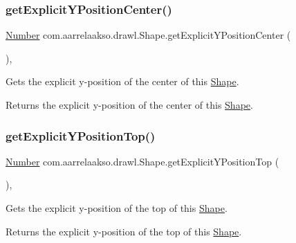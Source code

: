 \subsubsection{\texorpdfstring{get\+Explicit\+Y\+Position\+Center()}{getExplicitYPositionCenter()}}
{\footnotesize\ttfamily \hyperlink{interfacecom_1_1aarrelaakso_1_1drawl_1_1_number}{Number} com.\+aarrelaakso.\+drawl.\+Shape.\+get\+Explicit\+Y\+Position\+Center (\begin{DoxyParamCaption}{ }\end{DoxyParamCaption})\hspace{0.3cm}{\ttfamily [protected]}, {\ttfamily [inherited]}}



Gets the explicit y-\/position of the center of this \hyperlink{classcom_1_1aarrelaakso_1_1drawl_1_1_shape}{Shape}. 

\begin{DoxyReturn}{Returns}
the explicit y-\/position of the center of this \hyperlink{classcom_1_1aarrelaakso_1_1drawl_1_1_shape}{Shape}. 
\end{DoxyReturn}
\mbox{\label{classcom_1_1aarrelaakso_1_1drawl_1_1_shape_a8c65dff2026744ae10648de3908165e5}} 
\subsubsection{\texorpdfstring{get\+Explicit\+Y\+Position\+Top()}{getExplicitYPositionTop()}}
{\footnotesize\ttfamily \hyperlink{interfacecom_1_1aarrelaakso_1_1drawl_1_1_number}{Number} com.\+aarrelaakso.\+drawl.\+Shape.\+get\+Explicit\+Y\+Position\+Top (\begin{DoxyParamCaption}{ }\end{DoxyParamCaption})\hspace{0.3cm}{\ttfamily [protected]}, {\ttfamily [inherited]}}



Gets the explicit y-\/position of the top of this \hyperlink{classcom_1_1aarrelaakso_1_1drawl_1_1_shape}{Shape}. 

\begin{DoxyReturn}{Returns}
the explicit y-\/position of the top of this \hyperlink{classcom_1_1aarrelaakso_1_1drawl_1_1_shape}{Shape}. 
\end{DoxyReturn}
\mbox{\label{classcom_1_1aarrelaakso_1_1drawl_1_1_shape_a0d9a33a3e151aaceeec140bea343a650}} 
